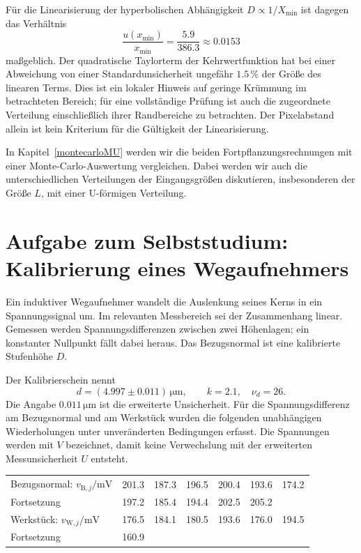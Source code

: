 Für die Linearisierung der hyperbolischen Abhängigkeit $D\propto1/X_{\mathrm{min}}$
ist dagegen das Verhältnis
\begin{equation}
\frac{u(x_{\mathrm{min}})}{x_{\mathrm{min}}}
=\frac{5.9}{386.3}\approx0.0153
\end{equation}
maßgeblich. Der quadratische Taylorterm der Kehrwertfunktion hat bei
einer Abweichung von einer Standardunsicherheit ungefähr $1.5\,\%$ der
Größe des linearen Terms. Dies ist ein lokaler Hinweis auf geringe
Krümmung im betrachteten Bereich; für eine vollständige Prüfung ist auch
die zugeordnete Verteilung einschließlich ihrer Randbereiche zu betrachten.
Der Pixelabstand allein ist kein Kriterium für die Gültigkeit der
Linearisierung. 

In Kapitel~\ref{montecarloMU} werden wir die beiden Fortpflanzungsrechnungen  mit einer Monte-Carlo-Auswertung vergleichen. Dabei werden wir auch die unterschiedlichen Verteilungen der Eingangsgrößen diskutieren, insbesonderen der Größe $L$, mit einer U-förmigen Verteilung. 

\section{Aufgabe zum Selbststudium: Kalibrierung eines Wegaufnehmers}
\label{AufgVor7}

Ein induktiver Wegaufnehmer wandelt die Auslenkung seines Kerns in ein
Spannungssignal um. Im relevanten Messbereich sei der Zusammenhang linear.
Gemessen werden Spannungsdifferenzen zwischen zwei Höhenlagen; ein
konstanter Nullpunkt fällt dabei heraus. Das Bezugsnormal ist eine
kalibrierte Stufenhöhe $D$.

Der Kalibrierschein nennt
\begin{equation}
d=(4.997\pm0.011)\,\mathrm{\mu m},\qquad k=2.1,\quad\nu_d=26.
\label{kalBezug}
\end{equation}
Die Angabe $0.011\,\mathrm{\mu m}$ ist die erweiterte Unsicherheit.
Für die Spannungsdifferenz am Bezugsnormal und am Werkstück wurden die
folgenden unabhängigen Wiederholungen unter unveränderten Bedingungen
erfasst. Die Spannungen werden mit $V$ bezeichnet, damit keine Verwechslung
mit der erweiterten Messunsicherheit $U$ entsteht.

\begin{center}
\small
\renewcommand{\arraystretch}{1.25}
\begin{tabular}{l|rrrrrr}
Bezugsnormal: $v_{\mathrm B,j}/\mathrm{mV}$
&201.3&187.3&196.5&200.4&193.6&174.2\\
Fortsetzung &197.2&185.4&194.4&202.5&205.2&\\
\hline
Werkstück: $v_{\mathrm W,j}/\mathrm{mV}$
&176.5&184.1&180.5&193.6&176.0&194.5\\
Fortsetzung &160.9&&&&&
\end{tabular}
\end{center}

